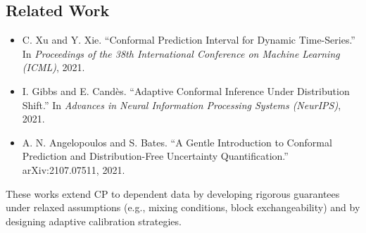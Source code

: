 \documentclass[11pt]{article}
\theoremstyle{remark}
\begin{document}
\subsection*{Related Work}
\begin{itemize}
    \item C. Xu and Y. Xie. ``Conformal Prediction Interval for Dynamic Time-Series.'' In \emph{Proceedings of the 38th International Conference on Machine Learning (ICML)}, 2021.
    \item I. Gibbs and E. Cand\`es. ``Adaptive Conformal Inference Under Distribution Shift.'' In \emph{Advances in Neural Information Processing Systems (NeurIPS)}, 2021.
    \item A. N. Angelopoulos and S. Bates. ``A Gentle Introduction to Conformal Prediction and Distribution-Free Uncertainty Quantification.'' arXiv:2107.07511, 2021.
\end{itemize}

These works extend CP to dependent data by developing rigorous guarantees under relaxed assumptions (e.g., mixing conditions, block exchangeability) and by designing adaptive calibration strategies.
\end{document}
